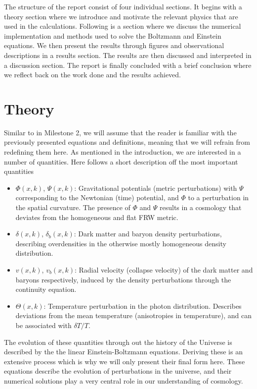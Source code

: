\documentclass[a4paper, 10pt, reqno]{amsart}
\begin{document}
The structure of the report consist of four individual sections. It begins with a theory section where we introduce and motivate the relevant physics that are used in the calculations. Following is a section where we discuss the numerical implementation and methods used to solve the Boltzmann and Einstein equations. We then present the results through figures and observational descriptions in a results section. The results are then discussed and interpreted in a discussion section. The report is finally concluded with a brief conclusion where we reflect back on the work done and the results achieved.

\section{Theory}
Similar to in Milestone 2, we will assume that the reader is familiar with the previously presented equations and definitions, meaning that we will refrain from redefining them here. As mentioned in the introduction, we are interested in a number of quantities. Here follows a short description off the most important quantities
\begin{itemize}
    \item $\Phi(x,k)$, $\Psi(x,k)$: Gravitational potentials (metric perturbations) with $\Psi$ corresponding to the Newtonian (time) potential, and $\Phi$ to a perturbation in the spatial curvature. The presence of $\Phi$ and $\Psi$ results in a cosmology that deviates from the homogeneous and flat FRW metric.
    \item $\delta(x,k)$, $\delta_b(x,k)$:  Dark matter and baryon density perturbations, describing overdensities in the otherwise mostly homogeneous density distribution.
    \item $v(x,k)$, $v_b(x,k)$: Radial velocity (collapse velocity) of the dark matter and baryons respectively, induced by the density perturbations through the continuity equation.
    \item $\Theta(x,k)$: Temperature perturbation in the photon distribution. Describes deviations from the mean temperature (anisotropies in temperature), and can be associated with $\delta T/T$.
\end{itemize}

The evolution of these quantities through out the history of the Universe is described by the the linear Einstein-Boltzmann equations. Deriving these is an extensive process which is why we will only present their final form here. These equations describe the evolution of perturbations in the universe, and their numerical solutions play a very central role in our understanding of cosmology. 
\end{document}
